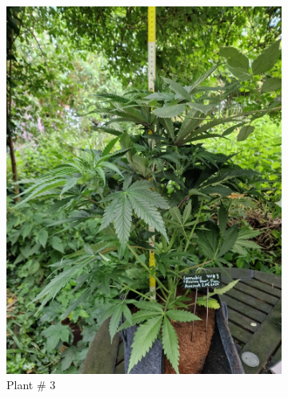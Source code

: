 \begin{figure}[htbp]
\begin{subfigure}[t]{.28\textwidth}
        \includegraphics[width=\linewidth]{plant_03_2024-06-17}
        \caption{Plant \# 3}
        \label{fig:plant_03_2024-06-17}
    \end{subfigure}
    \begin{subfigure}[t]{.28\textwidth}

\end{subfigure}
\end{figure}
